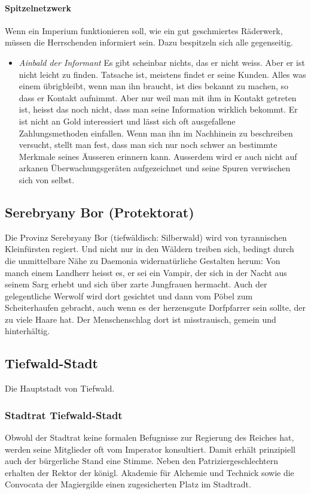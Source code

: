 \documentclass[12pt,twoside,twocolumn,openany]{book}
\begin{document}
\paragraph{Spitzelnetzwerk} Wenn ein Imperium funktionieren soll, wie ein gut geschmiertes Räderwerk, müssen die Herrschenden informiert sein. Dazu bespitzeln sich alle gegenseitig.
\begin{itemize}
	\item\textit{Ainbald der Informant} Es gibt scheinbar nichts, das er nicht weiss. Aber er ist nicht leicht zu finden. Tatsache ist, meistens findet er seine Kunden. Alles was einem übrigbleibt, wenn man ihn braucht, ist dies bekannt zu machen, so dass er Kontakt aufnimmt. Aber nur weil man mit ihm in Kontakt getreten ist, heisst das noch nicht, dass man seine Information wirklich bekommt. Er ist nicht an Gold interessiert und lässt sich oft ausgefallene Zahlungsmethoden einfallen.
	Wenn man ihn im Nachhinein zu beschreiben versucht, stellt man fest, dass man sich nur noch schwer an bestimmte Merkmale seines Äusseren erinnern kann. Ausserdem wird er auch nicht auf arkanen Überwachungsgeräten aufgezeichnet und seine Spuren verwischen sich von selbst.
\end{itemize}

\subsection{Serebryany Bor (Protektorat)}
Die Provinz Serebryany Bor (tiefwäldisch: Silberwald) wird von tyrannischen Kleinfürsten regiert. Und nicht nur in den Wäldern treiben sich, bedingt durch die unmittelbare Nähe zu Daemonia widernatürliche Gestalten herum: Von manch einem Landherr heisst es, er sei ein Vampir, der sich in der Nacht aus seinem Sarg erhebt und sich über zarte Jungfrauen hermacht. Auch der gelegentliche Werwolf wird dort gesichtet und dann vom Pöbel zum Scheiterhaufen gebracht, auch wenn es der herzensgute Dorfpfarrer sein sollte, der zu viele Haare hat. Der Menschenschlag dort ist misstrauisch, gemein und hinterhältig.

\subsection{Tiefwald-Stadt}

Die Hauptstadt von Tiefwald.

\subsubsection{Stadtrat Tiefwald-Stadt} Obwohl der Stadtrat keine formalen Befugnisse zur Regierung des Reiches hat, werden seine Mitglieder oft vom Imperator konsultiert. Damit erhält prinzipiell auch der bürgerliche Stand eine Stimme. Neben den Patriziergeschlechtern erhalten der Rektor der königl. Akademie für Alchemie und Technick sowie die Convocata der Magiergilde einen zugesicherten Platz im Stadtradt.
\end{document}
